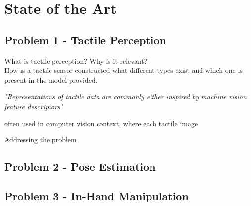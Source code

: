 
\chapter{State of the Art} \label{ch:state-of-the-art}

\section{Problem 1 - Tactile Perception} \label{sec:lit-rev-problem-1}

What is tactile perception? Why is it relevant? \\
How is a tactile sensor constructed \cite{recent-progress-in-technologies-for-tactile-sensors}
what different types exist and which one is present in the model provided.


\textit{"Representations of tactile data are commonly either inspired by machine vision feature descriptors"}

often used in computer vision context, where each tactile image 

Addressing the problem 





\section{Problem 2 - Pose Estimation} \label{sec:lit-rev-problem-2}

\section{Problem 3 - In-Hand Manipulation} \label{sec:lit-rev-problem-3}